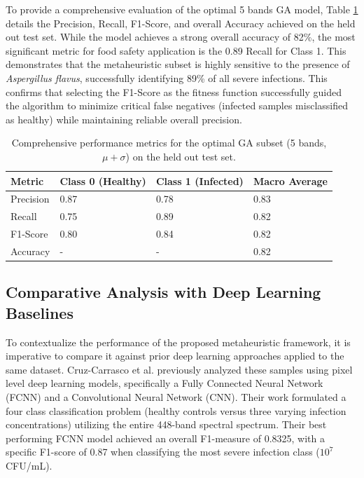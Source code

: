 \documentclass[runningheads]{llncs}
\begin{document}
To provide a comprehensive evaluation of the optimal 5 bands GA model, Table \ref{tab6} details the Precision, Recall, F1-Score, and overall Accuracy achieved on the held out test set. While the model achieves a strong overall accuracy of 82\%, the most significant metric for food safety application is the 0.89 Recall for Class 1. This demonstrates that the metaheuristic subset is highly sensitive to the presence of \textit{Aspergillus flavus}, successfully identifying 89\% of all severe infections. This confirms that selecting the F1-Score as the fitness function successfully guided the algorithm to minimize critical false negatives (infected samples misclassified as healthy) while maintaining reliable overall precision.   

\begin{table}
    \centering
    \caption{Comprehensive performance metrics for the optimal GA subset (5 bands, $\mu + \sigma$) on the held out test set.\label{tab6}}
    \begin{tabular}{l|l|l|l}
        \hline
        Metric & Class 0 (Healthy) & Class 1 (Infected) & Macro Average \\
        \hline
        Precision & 0.87 & 0.78 & 0.83 \\
        Recall & 0.75 & 0.89 & 0.82 \\
        F1-Score & 0.80 & 0.84 & 0.82 \\
        Accuracy & - & - & 0.82 \\
        \hline
    \end{tabular}
\end{table}

\subsection{Comparative Analysis with Deep Learning Baselines}
To contextualize the performance of the proposed metaheuristic framework, it is imperative to compare it against prior deep learning approaches applied to the same dataset. Cruz-Carrasco et al. \cite{cruz-carrasco_detection_2024} previously analyzed these samples using pixel level deep learning models, specifically a Fully Connected Neural Network (FCNN) and a Convolutional Neural Network (CNN). Their work formulated a four class classification problem (healthy controls versus three varying infection concentrations) utilizing the entire 448-band spectral spectrum. Their best performing FCNN model achieved an overall F1-measure of 0.8325, with a specific F1-score of 0.87 when classifying the most severe infection class ($10^7$ CFU/mL).
\end{document}
